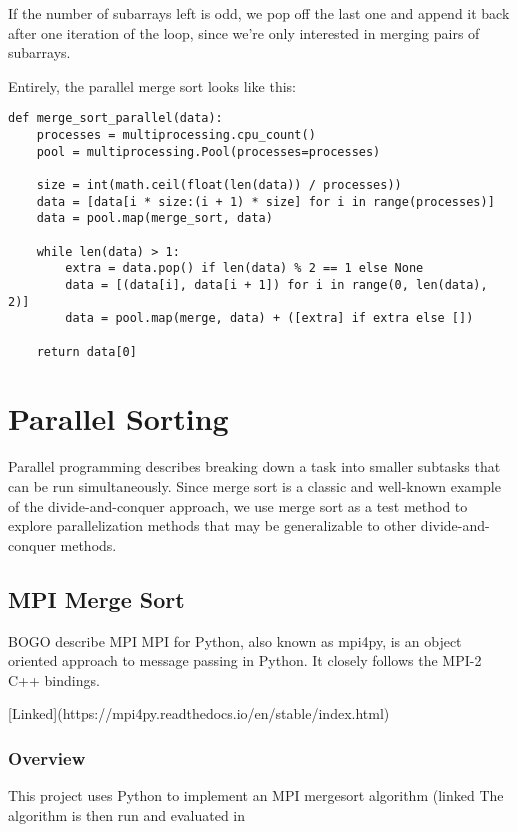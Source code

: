 If the number of subarrays left is odd, we pop off the last one and append it back after one iteration of the loop,
since we're only interested in merging pairs of subarrays.

Entirely, the parallel merge sort looks like this:

\begin{verbatim}
def merge_sort_parallel(data):
    processes = multiprocessing.cpu_count()
    pool = multiprocessing.Pool(processes=processes)

    size = int(math.ceil(float(len(data)) / processes))
    data = [data[i * size:(i + 1) * size] for i in range(processes)]
    data = pool.map(merge_sort, data)

    while len(data) > 1:
        extra = data.pop() if len(data) % 2 == 1 else None
        data = [(data[i], data[i + 1]) for i in range(0, len(data), 2)]
        data = pool.map(merge, data) + ([extra] if extra else [])

    return data[0]
\end{verbatim}
\section{Parallel Sorting}

Parallel programming describes breaking down a task into smaller subtasks that can be run simultaneously. Since merge
sort is a classic and well-known example of the divide-and-conquer approach, we use merge sort as a test method to
explore parallelization methods that may be generalizable to other divide-and-conquer methods.





\subsection{MPI Merge Sort}

BOGO describe MPI
MPI for Python, also known as mpi4py, is an object oriented approach to message passing in Python. It closely follows
the MPI-2 C++ bindings.

[Linked](https://mpi4py.readthedocs.io/en/stable/index.html)

\subsubsection{Overview}

This project uses Python to implement an MPI mergesort algorithm (linked
The algorithm is then run and evaluated in


